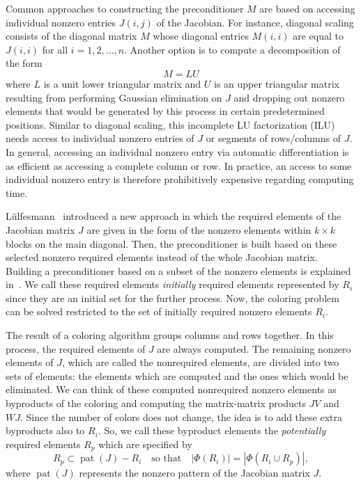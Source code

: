 \documentclass[12pt, twoside,a4paper,toc=bibliography]{scrbook}
\begin{document}
Common approaches to constructing the preconditioner $M$ are based on accessing individual
nonzero entries $J(i,j)$ of the Jacobian. For instance, diagonal scaling consists of the
diagonal matrix $M$ whose diagonal entries $M(i,i)$ are equal to $J(i,i)$ for all
$i=1,2,\dots, n$. Another option is to compute a decomposition of the form
$$M = LU$$
where $L$ is a unit lower triangular matrix and $U$ is an upper triangular matrix
resulting from performing Gaussian elimination on $J$ and dropping out nonzero elements
that would be generated by this process in certain predetermined positions. Similar to
diagonal scaling, this incomplete LU factorization (ILU) needs access to individual
nonzero entries of $J$ or segments of rows/columns of $J$. In general, accessing an
individual nonzero entry via automatic differentiation is as efficient as accessing a
complete column or row. In practice, an access to some individual nonzero entry is
therefore prohibitively expensive regarding computing time.

Lülfesmann~\cite{Lulfesmann2012Fap} introduced a new approach in which the required elements of the Jacobian matrix $J$
are given in the form of the nonzero elements within $k\times k$ blocks on the main diagonal.
Then, the preconditioner is built based on these selected nonzero required elements instead of
the whole Jacobian matrix.
Building a preconditioner based on a subset of the nonzero elements is explained in~\cite{Cullum2006}.
We call these required elements \textit{initially} required elements represented by $R_i$
since they are an initial set for the further process.
Now, the coloring problem can be solved
restricted to the set of initially required nonzero elements $R_i$.

The result of a coloring algorithm groups columns and rows together.
In this process, the required elements of $J$ are always computed.
The remaining nonzero elements of $J$, which are called the nonrequired elements,
are divided into two sets of
elements: the elements which are computed and the ones which would be
eliminated. We can think of these computed nonrequired nonzero elements as byproducts
of the coloring and computing the matrix-matrix products $JV$ and $WJ$.
Since the number of colors does not change,
the idea is to add these extra byproducts also to $R_i$.
So, we call these byproduct elements the \textit{potentially}
required elements $R_p$ which are specified by
$$
R_p \subset \operatorname{pat}(J) - R_i \quad\text{so that}\quad |\Phi(R_i)| = |\Phi(R_i\cup R_p)|,
$$
where $\operatorname{pat}(J)$ represents the nonzero pattern of the Jacobian matrix $J$.
\end{document}
